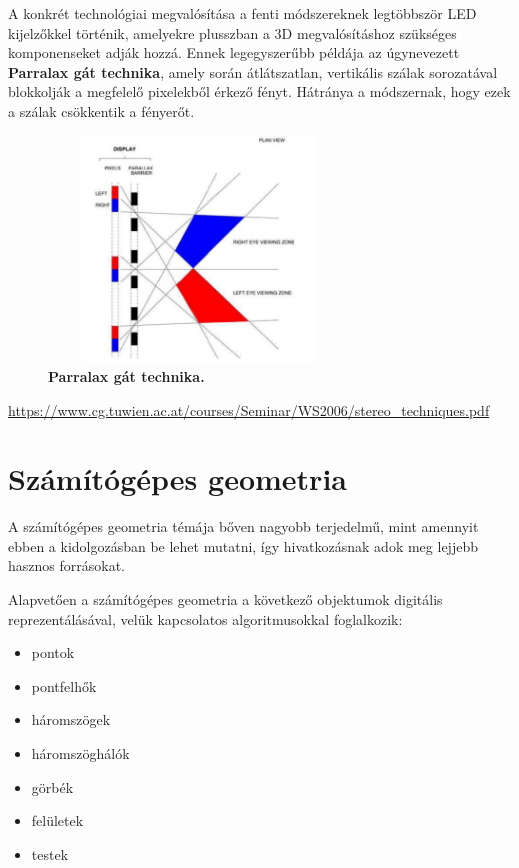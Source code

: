 \documentclass[12pt]{article}
\theoremstyle{plain}
\begin{document}
A konkrét technológiai megvalósítása a fenti módszereknek legtöbbször LED kijelzőkkel történik, amelyekre plusszban a 3D megvalósításhoz szükséges komponenseket adják hozzá. Ennek legegyszerűbb példája az úgynevezett \textbf{Parralax gát technika}, amely során átlátszatlan, vertikális szálak sorozatával blokkolják a megfelelő pixelekből érkező fényt. Hátránya a módszernak, hogy ezek a szálak csökkentik a fényerőt. 

\begin{figure}[H]
   \centering
   \includegraphics[width=8cm, height=6cm]{media/paralax.PNG}
   \caption{\textbf{Parralax gát technika.}}
   \label{fig:GeneralDiagram}
\end{figure}


\url{https://www.cg.tuwien.ac.at/courses/Seminar/WS2006/stereo_techniques.pdf}

\section{Számítógépes geometria}
A számítógépes geometria témája bőven nagyobb terjedelmű, mint amennyit ebben a kidolgozásban be lehet mutatni, így hivatkozásnak adok meg lejjebb hasznos forrásokat.  

Alapvetően a számítógépes geometria a következő objektumok digitális reprezentálásával, velük kapcsolatos algoritmusokkal foglalkozik:

\begin{itemize}
   \item pontok
   \item pontfelhők
   \item háromszögek
   \item háromszöghálók
   \item görbék
   \item felületek
   \item testek
   
\end{itemize}
\end{document}
